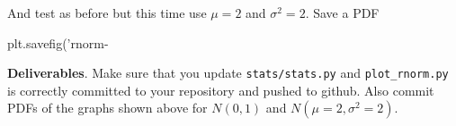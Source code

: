 \begin{fullwidth}
\step And test as before but this time use $\mu=2$ and $\sigma^2 = 2$. Save a PDF

\begin{pyverbatim}
plt.savefig('rnorm-%
\end{pyverbatim}


\begin{callout}{\bcplume}
{\bf Deliverables}. Make sure that you update {\tt stats/stats.py} and {\tt plot\_rnorm.py} is correctly committed to your repository and pushed to github. Also commit PDFs of the graphs shown above for $N(0,1)$ and $N(\mu=2,\sigma^2=2)$.
\end{callout}

\end{fullwidth}

